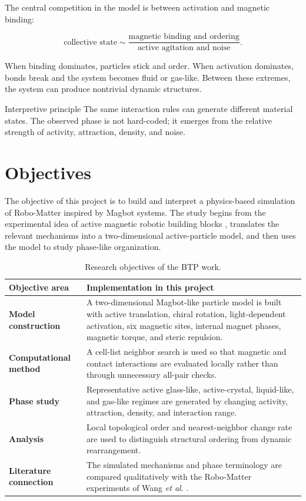 \documentclass[12pt,a4paper,oneside]{report}
\begin{document}
The central competition in the model is between activation and magnetic binding:

\begin{equation}
\text{collective state} \sim
\frac{\text{magnetic binding and ordering}}{\text{active agitation and noise}}.
\end{equation}

When binding dominates, particles stick and order. When activation dominates, bonds break and the system becomes fluid or gas-like. Between these extremes, the system can produce nontrivial dynamic structures.

\begin{resultbox}{Interpretive principle}
The same interaction rules can generate different material states. The observed phase is not hard-coded; it emerges from the relative strength of activity, attraction, density, and noise.
\end{resultbox}

\chapter{Objectives}

The objective of this project is to build and interpret a physics-based simulation of Robo-Matter inspired by Magbot systems. The study begins from the experimental idea of active magnetic robotic building blocks \cite{wang2024robomatter}, translates the relevant mechanisms into a two-dimensional active-particle model, and then uses the model to study phase-like organization.

\begin{table}[H]
\centering
\caption{Research objectives of the BTP work.}
\begin{tabularx}{\textwidth}{>{\bfseries}p{4.2cm}X}
\toprule
Objective area & Implementation in this project \\
\midrule
Model construction & A two-dimensional Magbot-like particle model is built with active translation, chiral rotation, light-dependent activation, six magnetic sites, internal magnet phases, magnetic torque, and steric repulsion. \\
Computational method & A cell-list neighbor search is used so that magnetic and contact interactions are evaluated locally rather than through unnecessary all-pair checks. \\
Phase study & Representative active glass-like, active-crystal, liquid-like, and gas-like regimes are generated by changing activity, attraction, density, and interaction range. \\
Analysis & Local topological order and nearest-neighbor change rate are used to distinguish structural ordering from dynamic rearrangement. \\
Literature connection & The simulated mechanisms and phase terminology are compared qualitatively with the Robo-Matter experiments of Wang \textit{et al.} \cite{wang2024robomatter}. \\
\bottomrule
\end{tabularx}
\end{table}
\end{document}
